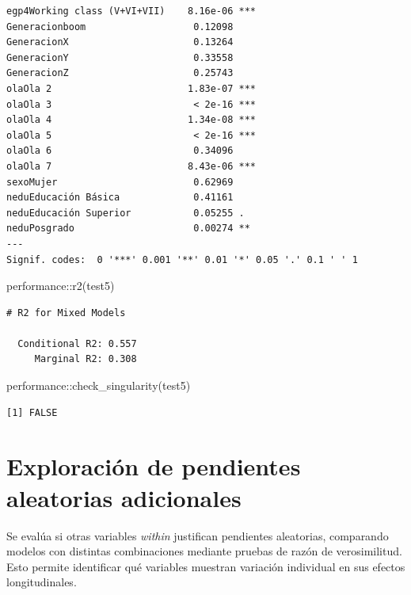 \documentclass[
  spanish,
  a4paper,
  oneside]{scrbook}
\newenvironment{Shaded}{\begin{snugshade}}{\end{snugshade}}
\newcommand{\FunctionTok}[1]{\textcolor[rgb]{0.28,0.35,0.67}{#1}}
\newcommand{\NormalTok}[1]{\textcolor[rgb]{0.00,0.23,0.31}{#1}}
\newcommand{\SpecialCharTok}[1]{\textcolor[rgb]{0.37,0.37,0.37}{#1}}
\begin{document}
\begin{verbatim}
egp4Working class (V+VI+VII)    8.16e-06 ***
Generacionboom                   0.12098    
GeneracionX                      0.13264    
GeneracionY                      0.33558    
GeneracionZ                      0.25743    
olaOla 2                        1.83e-07 ***
olaOla 3                         < 2e-16 ***
olaOla 4                        1.34e-08 ***
olaOla 5                         < 2e-16 ***
olaOla 6                         0.34096    
olaOla 7                        8.43e-06 ***
sexoMujer                        0.62969    
neduEducación Básica             0.41161    
neduEducación Superior           0.05255 .  
neduPosgrado                     0.00274 ** 
---
Signif. codes:  0 '***' 0.001 '**' 0.01 '*' 0.05 '.' 0.1 ' ' 1
\end{verbatim}

\begin{Shaded}
\begin{Highlighting}[]
\NormalTok{performance}\SpecialCharTok{::}\FunctionTok{r2}\NormalTok{(test5)}
\end{Highlighting}
\end{Shaded}

\begin{verbatim}
# R2 for Mixed Models

  Conditional R2: 0.557
     Marginal R2: 0.308
\end{verbatim}

\begin{Shaded}
\begin{Highlighting}[]
\NormalTok{performance}\SpecialCharTok{::}\FunctionTok{check\_singularity}\NormalTok{(test5)}
\end{Highlighting}
\end{Shaded}

\begin{verbatim}
[1] FALSE
\end{verbatim}

\chapter{Exploración de pendientes aleatorias
adicionales}\label{exploraciuxf3n-de-pendientes-aleatorias-adicionales}

Se evalúa si otras variables \emph{within} justifican pendientes
aleatorias, comparando modelos con distintas combinaciones mediante
pruebas de razón de verosimilitud. Esto permite identificar qué
variables muestran variación individual en sus efectos longitudinales.
\end{document}
